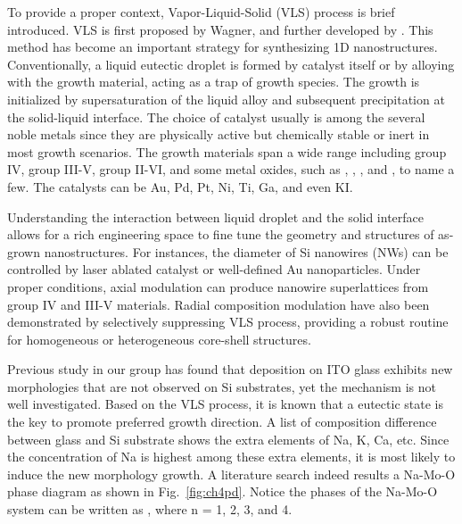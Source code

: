 To provide a proper context, Vapor-Liquid-Solid (VLS) process is brief introduced. VLS is first proposed by Wagner,\cite{Wagner1964} and further developed by \citeauthor{Givargizov1975}.\cite{Givargizov1975} This method has become an important strategy for synthesizing 1D nanostructures.\cite{Lieber1998} Conventionally, a liquid eutectic droplet is formed by catalyst itself or by alloying with the growth material, acting as a trap of growth species. The growth is initialized by supersaturation of the liquid alloy and subsequent precipitation at the solid-liquid interface. The choice of catalyst usually is among the several noble metals since they are physically active but chemically stable or inert in most growth scenarios. The growth materials span a wide range including group IV,\cite{Hochbaum2005} group III-V,\citep{Dalacu2013, Xiao2012, Dubrovskii2011} group II-VI,\cite{Hao2006} and some metal oxides, such as ,\citep{Huang2001a,Ramgir2010} ,\citep{HEUER1967, Nagashima2007} ,\cite{Pan2002} and ,\cite{Zhuge2012} to name a few. The catalysts can be Au, Pd, Pt, Ni,\cite{Xiao2012} Ti, Ga,\cite{Pan2002} and even KI.

Understanding the interaction between liquid droplet and the solid interface allows for a rich engineering space to fine tune the geometry and structures of as-grown nanostructures. For instances, the diameter of Si nanowires (NWs) can be controlled by laser ablated catalyst\cite{Morales1998} or well-defined Au nanoparticles.\cite{Cui2001b} Under proper conditions, axial modulation can produce nanowire superlattices from group IV and III-V materials.\citep{Gudiksen2002,Bjork2002}  Radial composition modulation have also been demonstrated by selectively suppressing VLS process, providing a robust routine for homogeneous or heterogeneous core-shell structures.\cite{Lauhon2002a}  

Previous study in our group has found that  deposition on ITO glass exhibits new morphologies that are not observed on Si substrates, yet the mechanism is not well investigated.\cite{predeep2011} Based on the VLS process, it is known that a eutectic state is the key to promote preferred growth direction. A list of composition difference between glass and Si substrate shows the extra elements of Na, K, Ca, etc. Since the concentration of Na is highest among these extra elements, it is most likely to induce the new morphology growth. A literature search indeed results a Na-Mo-O phase diagram as shown in Fig.~\ref{fig:ch4pd}.\cite{Hoermann1929} Notice the phases of the Na-Mo-O system can be written as , where n = 1, 2, 3, and 4. 


